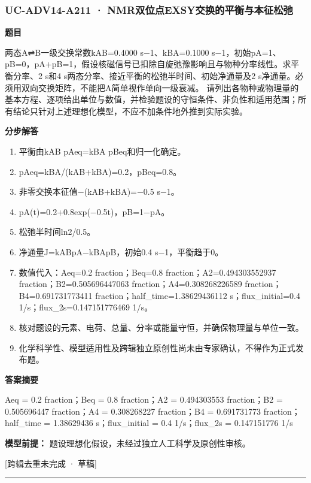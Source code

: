 \documentclass[UTF8,11pt,a4paper]{ctexart}
\begin{document}
\subsubsection*{UC-ADV14-A211 · NMR双位点EXSY交换的平衡与本征松弛}
\noindent\textbf{题目}\par
两态A⇌B一级交换常数kAB=0.4000 s−1、kBA=0.1000 s−1，初始pA=1、pB=0，pA+pB=1，假设核磁信号已扣除自旋弛豫影响且与物种分率线性。求平衡分率、2 s和4 s两态分率、接近平衡的松弛半时间、初始净通量及2 s净通量。必须用双向交换矩阵，不能把A简单视作单向一级衰减。 请列出各物种或物理量的基本方程、逐项给出单位与数值，并检验题设的守恒条件、非负性和适用范围；所有结论只针对上述理想化模型，不应不加条件地外推到实际实验。\par
\medskip\noindent\textbf{分步解答}
\begin{enumerate}
\item 平衡由kAB pAeq=kBA pBeq和归一化确定。
\item pAeq=kBA/(kAB+kBA)=0.2，pBeq=0.8。
\item 非零交换本征值−(kAB+kBA)=−0.5 s−1。
\item pA(t)=0.2+0.8exp(−0.5t)，pB=1−pA。
\item 松弛半时间ln2/0.5。
\item 净通量J=kABpA−kBApB，初始0.4 s−1，平衡趋于0。
\item 数值代入：Aeq=0.2 fraction；Beq=0.8 fraction；A2=0.494303552937 fraction；B2=0.505696447063 fraction；A4=0.308268226589 fraction；B4=0.691731773411 fraction；half\_time=1.38629436112 s；flux\_initial=0.4 1/s；flux\_2s=0.147151776469 1/s。
\item 核对题设的元素、电荷、总量、分率或能量守恒，并确保物理量与单位一致。
\item 化学科学性、模型适用性及跨辑独立原创性尚未由专家确认，不得作为正式发布题。
\end{enumerate}
\noindent\textbf{答案摘要}\par
Aeq = 0.2 fraction；Beq = 0.8 fraction；A2 = 0.494303553 fraction；B2 = 0.505696447 fraction；A4 = 0.308268227 fraction；B4 = 0.691731773 fraction；half\_time = 1.38629436 s；flux\_initial = 0.4 1/s；flux\_2s = 0.147151776 1/s\par
\noindent\textbf{模型前提：}
题设理想化假设，未经过独立人工科学及原创性审核。\par
\noindent\textcolor{red!65!black}{[跨辑去重未完成 · 草稿]} \par
\medskip\hrule\medskip
{}
\end{document}
